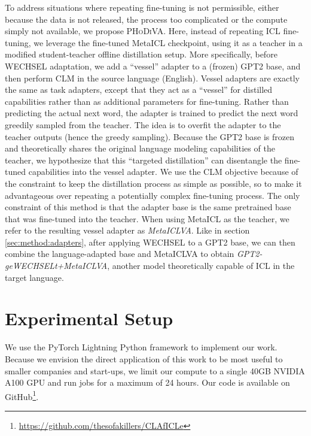 \documentclass[11pt]{article}
\begin{document}
To address situations where repeating fine-tuning is not permissible, either because the data is not
released, the process too complicated or the compute simply not available, we propose
\textsc{PHoDiVA}. Here, instead of repeating ICL fine-tuning, we leverage the fine-tuned MetaICL
checkpoint, using it as a teacher in a modified student-teacher offline distillation
\citep{hinton_distilling_2015} setup. More specifically, before WECHSEL adaptation, we add
a ``vessel'' adapter to a (frozen) GPT2 base, and then perform CLM in the source language (English).
Vessel adapters are exactly the same as task adapters, except that they act as a ``vessel'' for
distilled capabilities rather than as additional parameters for fine-tuning. Rather than predicting
the actual next word, the adapter is trained to predict the next word greedily sampled from the
teacher. The idea is to overfit the adapter to the teacher outputs (hence the greedy sampling).
Because the GPT2 base is frozen and theoretically shares the original language modeling capabilities
of the teacher, we hypothesize that this ``targeted distillation'' can disentangle the fine-tuned
capabilities into the vessel adapter. We use the CLM objective because of the constraint to keep the
distillation process as simple as possible, so to make it advantageous over repeating a potentially
complex fine-tuning process. The only constraint of this method is that the adapter base is the same
pretrained base that was fine-tuned into the teacher. When using MetaICL as the teacher, we refer to
the resulting vessel adapter as \textit{MetaICLVA}. Like in section \ref{sec:method:adapters}, after
applying WECHSEL to a GPT2 base, we can then combine the language-adapted base and MetaICLVA to
obtain \textit{GPT2-geWECHSELt+MetaICLVA}, another model theoretically capable of ICL in the target
language.

\section{Experimental Setup}

We use the PyTorch Lightning Python framework \citep{falcon_pytorch_2019} to implement our work.
Because we envision the direct application of this work to be most useful to smaller companies and
start-ups, we limit our compute to a single 40GB NVIDIA A100 GPU and run jobs for a maximum of 24
hours. Our code is available on
GitHub\footnote{\href{https://github.com/thesofakillers/CLAfICLe}{https://github.com/thesofakillers/CLAfICLe}}.
\end{document}
